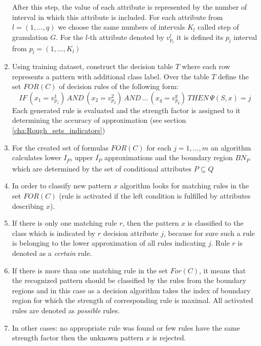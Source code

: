 \begin{enumerate}
        After this step, the value of each attribute is represented 
        by the number of interval in which this attribute is included. For each
        attribute from $l=(1, \ldots , q)$ we choose the same numbers of
        intervals $K_l$ called step of granulation $G$. For the $l$-th attribute 
        denoted by $v^l_{p_l}$ it is defined its $p_l$ interval from $p_l=(1, \ldots, K_l)$
    \item Using training dataset, construct the decision table $T$ where each
        row represents a pattern with additional class label. 
        Over the table $T$ define the set $FOR(C)$ of decision rules of
        the following form:
        $$IF \, (x_1 = v_{p_1}^1) \, AND \, (x_2=v_{p_2}^2) \, AND \, \ldots \,
        (x_q=v_{p_q}^q) \, THEN \, \Psi(S, x)=j$$
        Each generated rule is evaluated and the strength factor is assigned to
        it determining the accuracy of approximation (see section \ref{cha:Rough_sets_indicators})
    \item For the created set of formulas $FOR(C)$ for each $j=1, \ldots, m$
        an algorithm calculates lower $\underline{I_P}$, upper $\overline{I_P}$ approximations and the boundary
        region $BN_P$ which are determined by the set of conditional attributes $P
        \subseteq Q$ 
    \item In order to classify new pattern $x$ algorithm looks for matching rules in the
        set $FOR(C)$ (rule is activated if the left condition is fulfilled by
        attributes describing $x$).
    \item If there is only one matching rule $r$, then the pattern $x$ is
        classified to the class which is indicated by $r$ decision attribute $j$, 
        because for sure such a rule is belonging to the lower approximation of all rules 
        indicating $j$. Rule $r$ is denoted as a \textit{certain} rule.
    \item If there is more than one matching rule in the set $For(C)$, 
        it means that the recognized pattern should be classified by the 
        rules from the boundary regions and in this case as a decision
        algorithm takes the index of boundary region for which the strength of corresponding 
        rule is maximal. All activated rules are denoted as \textit{possible}
        rules.
    \item In other cases: no appropriate rule was found or few rules have the same strength
        factor then the unknown pattern $x$ is rejected.
\end{enumerate}
